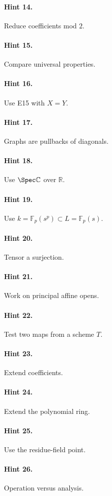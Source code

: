 \paragraph{Hint 14.} Reduce coefficients mod $2$.
\paragraph{Hint 15.} Compare universal properties.
\paragraph{Hint 16.} Use E15 with $X=Y$.
\paragraph{Hint 17.} Graphs are pullbacks of diagonals.
\paragraph{Hint 18.} Use $\Spec\mathbb C$ over $\mathbb R$.
\paragraph{Hint 19.} Use $k=\mathbb F_p(s^p)\subset L=\mathbb F_p(s)$.
\paragraph{Hint 20.} Tensor a surjection.
\paragraph{Hint 21.} Work on principal affine opens.
\paragraph{Hint 22.} Test two maps from a scheme $T$.
\paragraph{Hint 23.} Extend coefficients.
\paragraph{Hint 24.} Extend the polynomial ring.
\paragraph{Hint 25.} Use the residue-field point.
\paragraph{Hint 26.} Operation versus analysis.
